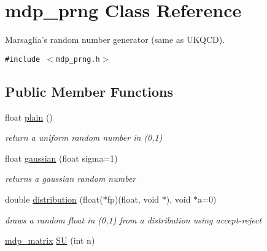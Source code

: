 \hypertarget{classmdp__prng}{
\section{mdp\_\-prng Class Reference}
\label{classmdp__prng}
}
Marsaglia's random number generator (same as UKQCD).  


{\tt \#include $<$mdp\_\-prng.h$>$}

\subsection*{Public Member Functions}
\begin{CompactItemize}
\item 
\hypertarget{classmdp__prng_261360660403dcd1a76305a8644b6a2d}{
float \hyperlink{classmdp__prng_261360660403dcd1a76305a8644b6a2d}{plain} ()}
\label{classmdp__prng_261360660403dcd1a76305a8644b6a2d}

\begin{CompactList}\small\item\em return a uniform random number in (0,1) \item\end{CompactList}\item 
\hypertarget{classmdp__prng_df372628df14ef01302472264a7f26d8}{
float \hyperlink{classmdp__prng_df372628df14ef01302472264a7f26d8}{gaussian} (float sigma=1)}
\label{classmdp__prng_df372628df14ef01302472264a7f26d8}

\begin{CompactList}\small\item\em returns a gaussian random number \item\end{CompactList}\item 
\hypertarget{classmdp__prng_2ba8807aa153b9b222d6d724da06dfdd}{
double \hyperlink{classmdp__prng_2ba8807aa153b9b222d6d724da06dfdd}{distribution} (float($\ast$fp)(float, void $\ast$), void $\ast$a=0)}
\label{classmdp__prng_2ba8807aa153b9b222d6d724da06dfdd}

\begin{CompactList}\small\item\em draws a random float in (0,1) from a distribution using accept-reject \item\end{CompactList}\item 
\hypertarget{classmdp__prng_348d0a778f0c1e3dd71e163bad950936}{
\hyperlink{classmdp__matrix}{mdp\_\-matrix} \hyperlink{classmdp__prng_348d0a778f0c1e3dd71e163bad950936}{SU} (int n)}
\label{classmdp__prng_348d0a778f0c1e3dd71e163bad950936}


\end{CompactItemize}

